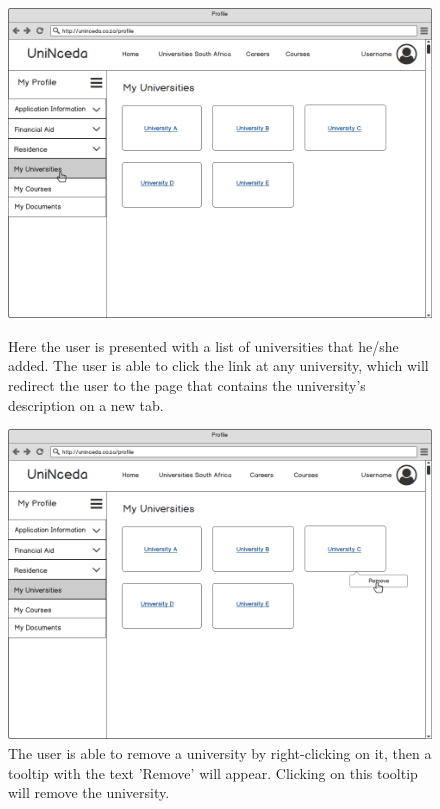 \documentclass[a4paper, 12pt]{article}
\begin{document}
\begin{figure}[H]
\centering
\includegraphics[scale=0.35]{ProfileMyUniversities}
\caption{Here the user is presented with a list of universities that he/she added. The user is able to click the link at any university, which will redirect the user to the page that contains the university's description on a new tab.}
\label{ProfileMyUniversities}


\vspace{1cm}

\includegraphics[scale=0.35]{ProfileMyUniversitiesRemoveUniversity}
\caption{The user is able to remove a university by right-clicking on it, then a tooltip with the text 'Remove' will appear. Clicking on this tooltip will remove the university.}
\label{ProfileMyUniversitiesRemoveUniversity}


\end{figure}
\end{document}
